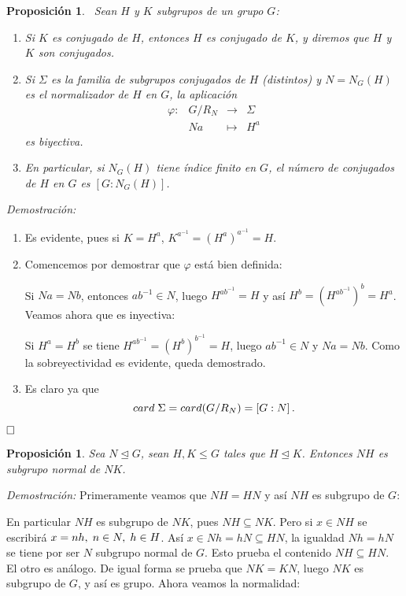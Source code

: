 \documentclass[12pt]{article}
\newtheorem{proposition}[theorem]{Proposición}
\begin{document}
\begin{proposition}~\label{eq:conjug}Sean $H$ y $K$ subgrupos de un grupo $G$:
\begin{enumerate}
\item Si $K$ es conjugado de $H$, entonces $H$ es conjugado de $K$, y diremos que $H$ y $K$ son \textit{conjugados}.
\item Si $\Sigma$ es la familia de subgrupos conjugados de $H$ (distintos) y $N = N_{G}(H)$ es el normalizador de $H$ en $G$, la aplicación $$
\begin{array}{rccl}
\varphi \colon &G/R_{N} & \longrightarrow & \Sigma\\
&Na & \longmapsto &H^{a}
\end{array}
$$ es biyectiva.
\item En particular, si $N_{G}(H)$ tiene índice finito en $G$, el número de conjugados de $H$ en $G$ es $\left[ G:N_{G}(H) \right]$.
\end{enumerate}
\end{proposition}
\emph{Demostración: }\begin{enumerate}
\item Es evidente, pues si $K = H^{a}$, $K^{a^{-1}} =(H^{a})^{a^{-1}} = H$.
\item Comencemos por demostrar que $\varphi$ está bien definida:

Si $Na = Nb$, entonces $ab^{-1} \in N$, luego $H^{ab^{-1}} = H$ y así $H^{b} = (H^{ab^{-1}})^{b} = H^{a}$. Veamos ahora que es inyectiva: 

Si $H^{a} = H^{b}$ se tiene $H^{ab^{-1}} = (H^{b})^{b^{-1}} = H$, luego $ab^{-1} \in N$ y $Na = Nb.$ Como la sobreyectividad es evidente, queda demostrado.
\item  Es claro ya que $$card\hspace{0.1cm} \Sigma = card(G/R_{N}) = \left[ G:N \right].$$
\end{enumerate}
$\hfill \square$

\begin{proposition}\label{eq:nhnormal} Sea $N \unlhd G$, sean $H, K \leq G$ tales que $H \unlhd K$. Entonces $NH$ es subgrupo normal de $NK$.
\end{proposition}
\emph{Demostración: }Primeramente veamos que $NH=HN$ y así $NH$ es subgrupo de $G$:

En particular $NH$ es subgrupo de $NK$, pues $NH \subseteq NK$. Pero si $x \in NH$ se escribirá $x = nh, \hspace{0.1cm} n \in N, \hspace{0.1cm} h \in H$. Así $x \in Nh = hN \subseteq HN$, la igualdad $Nh = hN$ se tiene por ser $N$ subgrupo normal de $G$. Esto prueba el contenido $NH \subseteq HN$. El otro es análogo. De igual forma se prueba que $NK = KN$, luego $NK$ es subgrupo de $G$, y así es grupo. Ahora veamos la normalidad:
\end{document}
